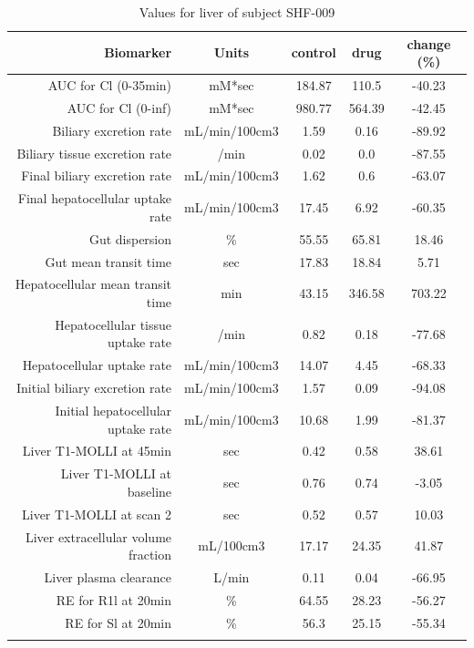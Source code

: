 \documentclass{epflreport}%
\begin{document}
%
\clearpage%
\begin{longtable}{rcccc}%
\hline%
Biomarker&Units&control&drug&change (\%)\\%
\hline%
AUC for Cl (0{-}35min)&mM*sec&184.87&110.5&{-}40.23\\%
AUC for Cl (0{-}inf)&mM*sec&980.77&564.39&{-}42.45\\%
Biliary excretion rate&mL/min/100cm3&1.59&0.16&{-}89.92\\%
Biliary tissue excretion rate&/min&0.02&0.0&{-}87.55\\%
Final biliary excretion rate&mL/min/100cm3&1.62&0.6&{-}63.07\\%
Final hepatocellular uptake rate&mL/min/100cm3&17.45&6.92&{-}60.35\\%
Gut dispersion&\%&55.55&65.81&18.46\\%
Gut mean transit time&sec&17.83&18.84&5.71\\%
Hepatocellular mean transit time&min&43.15&346.58&703.22\\%
Hepatocellular tissue uptake rate&/min&0.82&0.18&{-}77.68\\%
Hepatocellular uptake rate&mL/min/100cm3&14.07&4.45&{-}68.33\\%
Initial biliary excretion rate&mL/min/100cm3&1.57&0.09&{-}94.08\\%
Initial hepatocellular uptake rate&mL/min/100cm3&10.68&1.99&{-}81.37\\%
Liver T1{-}MOLLI at 45min&sec&0.42&0.58&38.61\\%
Liver T1{-}MOLLI at baseline&sec&0.76&0.74&{-}3.05\\%
Liver T1{-}MOLLI at scan 2&sec&0.52&0.57&10.03\\%
Liver extracellular volume fraction&mL/100cm3&17.17&24.35&41.87\\%
Liver plasma clearance&L/min&0.11&0.04&{-}66.95\\%
RE for R1l at 20min&\%&64.55&28.23&{-}56.27\\%
RE for Sl at 20min&\%&56.3&25.15&{-}55.34\\%
\hline%
\caption{Values for liver of subject SHF-009} \\%
\end{longtable}%
\end{document}
